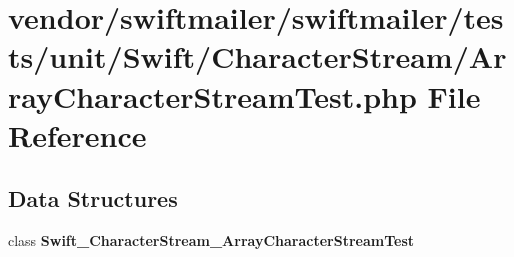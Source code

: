 \section{vendor/swiftmailer/swiftmailer/tests/unit/\+Swift/\+Character\+Stream/\+Array\+Character\+Stream\+Test.php File Reference}
\label{_array_character_stream_test_8php}
\subsection*{Data Structures}
\begin{DoxyCompactItemize}
\item 
class {\bf Swift\+\_\+\+Character\+Stream\+\_\+\+Array\+Character\+Stream\+Test}
\end{DoxyCompactItemize}
